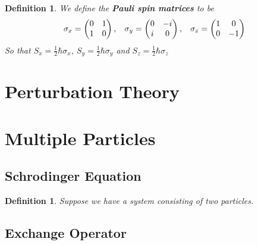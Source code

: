 \documentclass[12pt]{amsart}
\newtheorem{defn}[thm]{Definition}
\newcommand{\sig}{\sigma}
\begin{document}
\begin{defn}
We define the \textbf{Pauli spin matrices} to be $$\sig_x = \begin{pmatrix}
0 & 1 \\
1 & 0
\end{pmatrix}, \hspace{.3cm}
\sig_y = \begin{pmatrix}
0 & -i \\
i & 0
\end{pmatrix}, \hspace{.3cm}
\sig_z = \begin{pmatrix}
1 & 0 \\
0 & -1
\end{pmatrix}$$ So that $S_x = \frac{1}{2} \hbar\sig_x$, $S_y = \frac{1}{2} \hbar\sig_y$ and $S_z = \frac{1}{2} \hbar\sig_z$
\end{defn}

\section{Perturbation Theory}

\section{Multiple Particles}

\subsection{Schrodinger Equation}
\begin{defn}
Suppose we have a system consisting of two particles.  
\end{defn}

\subsection{Exchange Operator}
\end{document}

